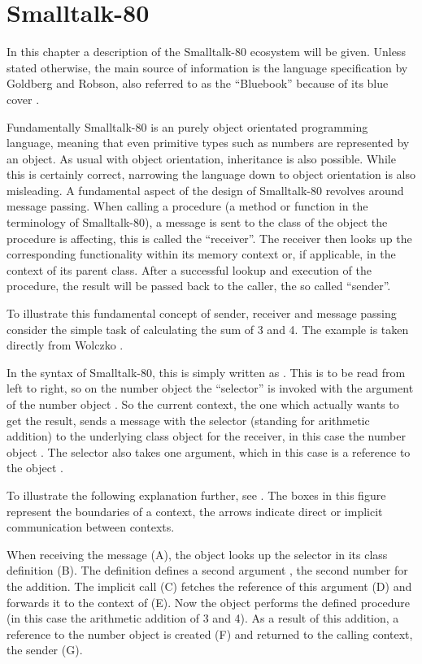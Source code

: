 \chapter{Smalltalk-80}\label{cha:smalltalk}
In this chapter a description of the Smalltalk-80 ecosystem will be given. 
Unless stated otherwise, the main source of information is the language specification by Goldberg and Robson, also referred to as the \enquote{Bluebook} because of its blue cover \cite{bluebook1983}.

Fundamentally Smalltalk-80 is an purely object orientated programming language, meaning that even primitive types such as numbers are represented by an object. 
As usual with object orientation, inheritance is also possible.
While this is certainly correct, narrowing the language down to object orientation is also misleading. 
A fundamental aspect of the design of Smalltalk-80 revolves around message passing. 
When calling a procedure (a method or function in the terminology of Smalltalk-80), a message is sent to the class of the object the procedure is affecting, this is called the \enquote{receiver}.
The receiver then looks up the corresponding functionality within its memory context or, if applicable, in the context of its parent class.
After a successful lookup and execution of the procedure, the result will be passed back to the caller, the so called \enquote{sender}. 

To illustrate this fundamental concept of sender, receiver and message passing consider the simple task of calculating the sum of 3 and 4. 
The example is taken directly from Wolczko \cite{Wolczko1984}.

In the syntax of Smalltalk-80, this is simply written as .
This is to be read from left to right, so on the number object  the \enquote{selector} \stcode{+} is invoked with the argument of the number object .
So the current context, the one which actually wants to get the result, sends a message with the selector \stcode{+} (standing for arithmetic addition) to the underlying class object for the receiver, in this case the number object . 
The selector \stcode{+} also takes one argument, which in this case is a reference to the object . 

To illustrate the following explanation further, see . The boxes in this figure represent the boundaries of a context, the arrows indicate direct or implicit communication between contexts.

When receiving the message (A), the object  looks up the selector in its class definition (B). 
The definition defines a second argument , the second number for the addition. The implicit call (C) fetches the reference of this argument (D) and forwards it to the context of  (E).
Now the object  performs the defined procedure (in this case the arithmetic addition of 3 and 4). 
As a result of this addition, a reference to the number object  is created (F) and returned to the calling context, the sender (G). 

